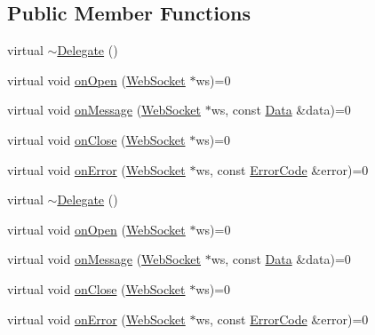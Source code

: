 \subsection*{Public Member Functions}
\begin{DoxyCompactItemize}
\item 
virtual \hyperlink{classnetwork_1_1WebSocket_1_1Delegate_acbed26b7e74c7ffff05ff481bfbb0c43}{$\sim$\+Delegate} ()
\item 
virtual void \hyperlink{classnetwork_1_1WebSocket_1_1Delegate_a46664a075b60ee8f6ed1a33a2f2ec77d}{on\+Open} (\hyperlink{classnetwork_1_1WebSocket}{Web\+Socket} $\ast$ws)=0
\item 
virtual void \hyperlink{classnetwork_1_1WebSocket_1_1Delegate_a879c2f96e39ce8d68e4fbc2827ea4377}{on\+Message} (\hyperlink{classnetwork_1_1WebSocket}{Web\+Socket} $\ast$ws, const \hyperlink{structnetwork_1_1WebSocket_1_1Data}{Data} \&data)=0
\item 
virtual void \hyperlink{classnetwork_1_1WebSocket_1_1Delegate_a67305bda05963c9b54339bd784be7bc4}{on\+Close} (\hyperlink{classnetwork_1_1WebSocket}{Web\+Socket} $\ast$ws)=0
\item 
virtual void \hyperlink{classnetwork_1_1WebSocket_1_1Delegate_a0ed2d5dde9abc2901f387b7274221dc4}{on\+Error} (\hyperlink{classnetwork_1_1WebSocket}{Web\+Socket} $\ast$ws, const \hyperlink{classnetwork_1_1WebSocket_a33c111a23355ac485e3a56c9d0ab9a59}{Error\+Code} \&error)=0
\item 
virtual \hyperlink{classnetwork_1_1WebSocket_1_1Delegate_acbed26b7e74c7ffff05ff481bfbb0c43}{$\sim$\+Delegate} ()
\item 
virtual void \hyperlink{classnetwork_1_1WebSocket_1_1Delegate_a46664a075b60ee8f6ed1a33a2f2ec77d}{on\+Open} (\hyperlink{classnetwork_1_1WebSocket}{Web\+Socket} $\ast$ws)=0
\item 
virtual void \hyperlink{classnetwork_1_1WebSocket_1_1Delegate_a879c2f96e39ce8d68e4fbc2827ea4377}{on\+Message} (\hyperlink{classnetwork_1_1WebSocket}{Web\+Socket} $\ast$ws, const \hyperlink{structnetwork_1_1WebSocket_1_1Data}{Data} \&data)=0
\item 
virtual void \hyperlink{classnetwork_1_1WebSocket_1_1Delegate_a67305bda05963c9b54339bd784be7bc4}{on\+Close} (\hyperlink{classnetwork_1_1WebSocket}{Web\+Socket} $\ast$ws)=0
\item 
virtual void \hyperlink{classnetwork_1_1WebSocket_1_1Delegate_a0ed2d5dde9abc2901f387b7274221dc4}{on\+Error} (\hyperlink{classnetwork_1_1WebSocket}{Web\+Socket} $\ast$ws, const \hyperlink{classnetwork_1_1WebSocket_a33c111a23355ac485e3a56c9d0ab9a59}{Error\+Code} \&error)=0
\end{DoxyCompactItemize}


